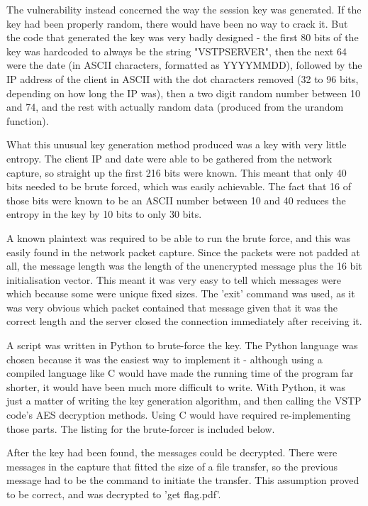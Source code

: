 The vulnerability instead concerned the way the session key was generated. If
the key had been properly random, there would have been no way to crack it. But
the code that generated the key was very badly designed - the first 80 bits of
the key was hardcoded to always be the string "VSTPSERVER", then the next 64
were the date (in ASCII characters, formatted as YYYYMMDD), followed by the IP
address of the client in ASCII with the dot characters removed (32 to 96 bits,
depending on how long the IP was), then a two digit random number between 10
and 74, and the rest with actually random data (produced from the urandom 
function).

What this unusual key generation method produced was a key with very little
entropy. The client IP and date were able to be gathered from the network
capture, so straight up the first 216 bits were known. This meant that
only 40 bits needed to be brute forced, which was easily achievable. The
fact that 16 of those bits were known to be an ASCII number between 10
and 40 reduces the entropy in the key by 10 bits to only 30 bits.

A known plaintext was required to be able to run the brute force, and this
was easily found in the network packet capture. Since the packets were not
padded at all, the message length was the length of the unencrypted message
plus the 16 bit initialisation vector. This meant it was very easy to tell
which messages were which because some were unique fixed sizes. The 'exit'
command was used, as it was very obvious which packet contained that message
given that it was the correct length and the server closed the connection
immediately after receiving it.

A script was written in Python to brute-force the key. The Python language
was chosen because it was the easiest way to implement it - although using a
compiled language like C would have made the running time of the program far
shorter, it would have been much more difficult to write. With Python, it was
just a matter of writing the key generation algorithm, and then calling the
VSTP code's AES decryption methods. Using C would have required 
re-implementing those parts. The listing for the brute-forcer is included
below.

After the key had been found, the messages could be decrypted. There were
messages in the capture that fitted the size of a file transfer, so the
previous message had to be the command to initiate the transfer. This
assumption proved to be correct, and was decrypted to 'get flag.pdf'.

